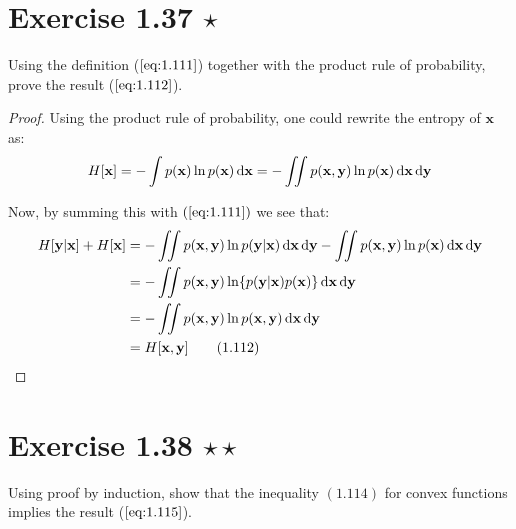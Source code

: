 \section*{Exercise 1.37 $\star$}
Using the definition ($\ref{eq:1.111}$) together with the product rule
of probability, prove the result ($\ref{eq:1.112}$). 

\vspace{1em}

\begin{proof}
    Using the product rule of probability, one could rewrite the entropy of $\mathbf{x}$ as:
    \[
        H[\mathbf{x}] 
        = -\int p(\mathbf{x}) \ln p(\mathbf{x}) \mathop{}\!\mathrm{d} \mathbf{x}
        = -\iint p(\mathbf{x}, \mathbf{y}) \ln p(\mathbf{x}) \mathop{}\!\mathrm{d} \mathbf{x} \mathop{}\!\mathrm{d} \mathbf{y}
    \] 

    Now, by summing this with $(\ref{eq:1.111})$ we see that:
    \begin{align*}
         H[\mathbf{y} | \mathbf{x}] + H[\mathbf{x}]
        &= -\iint p(\mathbf{x}, \mathbf{y}) \ln p(\mathbf{y} | \mathbf{x}) \diff \mathbf{x} \diff \mathbf{y}
        -\iint p(\mathbf{x}, \mathbf{y}) \ln p(\mathbf{x}) \diff \mathbf{x} \diff \mathbf{y} \\
        &= -\iint p(\mathbf{x}, \mathbf{y}) \ln \{p(\mathbf{y} | \mathbf{x})p(\mathbf{x})\} \diff \mathbf{x} \diff \mathbf{y} \\
        &= -\iint p(\mathbf{x}, \mathbf{y}) \ln p(\mathbf{x}, \mathbf{y}) \diff \mathbf{x} \diff \mathbf{y} \\
        &= H[\mathbf{x}, \mathbf{y}] \tag{1.112}
    \end{align*}
\end{proof}

\section*{Exercise 1.38 $\star \star$}
Using proof by induction, show that the inequality $(1.114)$ for
convex functions implies the result ($\ref{eq:1.115}$).

\vspace{1em}

